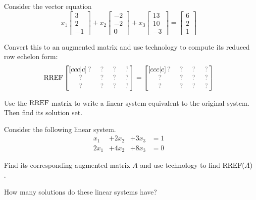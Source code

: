 \begin{activity}{10}
Consider the vector equation
 \[ x_1 \begin{bmatrix} 3 \\ 2\\ -1 \end{bmatrix}+x_2 \begin{bmatrix}-2 \\ -2 \\ 0 \end{bmatrix}+x_3\begin{bmatrix} 13 \\ 10 \\ -3 \end{bmatrix}=\begin{bmatrix} 6 \\ 2 \\ 1 \end{bmatrix}\]
\begin{subactivity}
Convert this to an augmented matrix and use technology to compute its
reduced row echelon form:
\[
  \RREF
  \begin{bmatrix}[ccc|c]
    \unknown&\unknown&\unknown&\unknown\\ 
    \unknown&\unknown&\unknown&\unknown\\ 
    \unknown&\unknown&\unknown&\unknown\\ 
  \end{bmatrix}
=
  \begin{bmatrix}[ccc|c]
    \unknown&\unknown&\unknown&\unknown\\ 
    \unknown&\unknown&\unknown&\unknown\\ 
    \unknown&\unknown&\unknown&\unknown\\ 
  \end{bmatrix}
\]
\end{subactivity}
\begin{subactivity}
Use the \(\operatorname{RREF}\) matrix to write a linear system equivalent
to the original system. Then find its solution set.
\end{subactivity}
\end{activity}

\begin{activity}{10}
  Consider the following linear system.
  	\begin{alignat*}{4}
  		x_1 &+ 2x_2 &+ 3x_3 &= 1\\
  	  2x_1 &+ 4x_2 &+ 8x_3 &= 0
  	\end{alignat*}
  \begin{subactivity}
    Find its corresponding augmented matrix \(A\) and
    use technology to find \(\operatorname{RREF}(A)\).
  \end{subactivity}
  \begin{subactivity}
    How many solutions do these linear systems have?
  \end{subactivity}
\end{activity}

